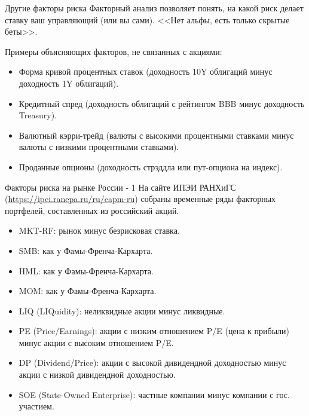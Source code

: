 \documentclass{beamer}
\begin{document}
\begin{frame}{Другие факторы риска}
\justify
Факторный анализ позволяет понять, на какой риск делает ставку ваш управляющий (или вы сами). <<Нет альфы, есть только скрытые беты>>.

\vspace{\baselineskip}
Примеры объясняющих факторов, не связанных с акциями:
\begin{itemize}
\justifying
\item Форма кривой процентных ставок (доходность 10Y облигаций минус доходность 1Y облигаций).
\item Кредитный спред (доходность облигаций с рейтингом BBB минус доходность Treasury).
\item Валютный кэрри-трейд (валюты с высокими процентными ставками минус валюты с низкими процентными ставками).
\item Проданные опционы (доходность стрэддла или пут-опциона на индекс).
\end{itemize}
\end{frame}



\begin{frame}{Факторы риска на рынке России - 1}
\justify
На сайте ИПЭИ РАНХиГС ({\small \url{https://ipei.ranepa.ru/ru/capm-ru}}) собраны временные ряды факторных портфелей, составленных из российский акций.
\begin{itemize}
\justifying
\item MKT-RF: рынок минус безрисковая ставка.
\item SMB: как у Фамы-Френча-Кархарта.
\item HML: как у Фамы-Френча-Кархарта.
\item MOM: как у Фамы-Френча-Кархарта.
\item LIQ (LIQuidity): неликвидные акции минус ликвидные.
\item PE (Price/Earnings): акции с низким отношением P/E (цена к прибыли) минус акции с высоким отношением P/E.
\item DP (Dividend/Price): акции с высокой дивидендной доходностью минус акции с низкой дивидендной доходностью.
\item SOE (State-Owned Enterprise): частные компании минус компании с гос. участием.
\end{itemize}
\end{frame}
\end{document}
